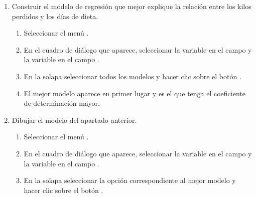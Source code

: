 \begin{enumerate}[leftmargin=*]
\begin{enumerate}
\item Construir el modelo de regresión que mejor explique la relación entre los kilos perdidos y los días de dieta.
\begin{indicacion}{
\begin{enumerate}
\item Seleccionar el menú .
\item En el cuadro de diálogo que aparece, seleccionar la variable  en el campo  y la variable  en el campo .
\item En la solapa  seleccionar todos los modelos y hacer clic sobre el botón .
\item El mejor modelo aparece en primer lugar y es el que tenga el coeficiente de determinación mayor.
\end{enumerate}}
\end{indicacion}

\item Dibujar el modelo del apartado anterior.
\begin{indicacion}{
\begin{enumerate}
\item Seleccionar el menú .
\item En el cuadro de diálogo que aparece, seleccionar la variable  en el campo 
y la variable  en el campo .
\item En la solapa  seleccionar la opción correspondiente al mejor modelo y hacer
clic sobre el botón .
\end{enumerate}}
\end{indicacion}


\end{enumerate}
\end{enumerate}
